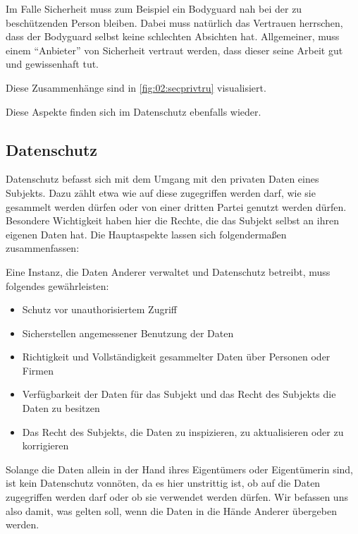 Im Falle Sicherheit muss zum Beispiel ein Bodyguard nah bei der zu beschützenden Person bleiben.
Dabei muss natürlich das Vertrauen herrschen, dass der Bodyguard selbst keine schlechten Absichten hat.
Allgemeiner, muss einem \enquote{Anbieter} von Sicherheit vertraut werden, dass dieser seine Arbeit gut und gewissenhaft tut.

Diese Zusammenhänge sind in \cref{fig:02:secprivtru} visualisiert.

Diese Aspekte finden sich im Datenschutz ebenfalls wieder.

\subsection{Datenschutz}

Datenschutz befasst sich mit dem Umgang mit den privaten Daten eines Subjekts.
Dazu zählt etwa wie auf diese zugegriffen werden darf, wie sie gesammelt werden dürfen oder von einer dritten Partei genutzt werden dürfen.
Besondere Wichtigkeit haben hier die Rechte, die das Subjekt selbst an ihren eigenen Daten hat.
Die Hauptaspekte lassen sich folgendermaßen zusammenfassen:\cite{lee_ethical_2016}  

\begin{center}
\parbox{0.9\textwidth}{
    Eine Instanz, die Daten Anderer verwaltet und Datenschutz betreibt, muss folgendes gewährleisten: 
    \begin{itemize}
        \item Schutz vor unauthorisiertem Zugriff
        \item Sicherstellen angemessener Benutzung der Daten
        \item Richtigkeit und Vollständigkeit gesammelter Daten über Personen oder Firmen
        \item Verfügbarkeit der Daten für das Subjekt und das Recht des Subjekts die Daten zu besitzen
        \item Das Recht des Subjekts, die Daten zu inspizieren, zu aktualisieren oder zu korrigieren
    \end{itemize}
}
\end{center}

Solange die Daten allein in der Hand ihres Eigentümers oder Eigentümerin sind, ist kein Datenschutz vonnöten,
da es hier unstrittig ist, ob auf die Daten zugegriffen werden darf oder ob sie verwendet werden dürfen.
Wir befassen uns also damit, was gelten soll, wenn die Daten in die Hände Anderer übergeben werden.

